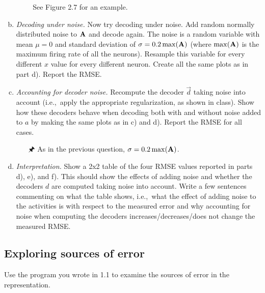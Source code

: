 \begin{enumerate}[a)]
		\begin{itemize}
			\item[{\symbolfont 📖}] See Figure 2.7 for an example.
		\end{itemize}
		\item {} \textit{Decoding under noise.} Now try decoding under noise. Add random normally distributed noise to ${\mathbf{A}}$ and decode again. The noise is a random variable with mean $\mu=0$ and standard deviation of $\sigma=0.2 \max({\mathbf{A}})$ (where $\max({\mathbf{A}})$ is the maximum firing rate of all the neurons). Resample this variable for every different $x$ value for every different neuron. Create all the same plots as in part d). Report the RMSE.
		\item {} \textit{Accounting for decoder noise.} Recompute the decoder $\vec d$ taking noise into account (i.e.,~apply the appropriate regularization, as shown in class). Show how these decoders behave when decoding both with and without noise added to $a$ by making the same plots as in c) and d). Report the RMSE for all cases.
		\begin{itemize}
			\item[{\symbolfont 🖈}] As in the previous question, $\sigma = 0.2 \max({\mathbf{A}})$.
		\end{itemize}
		\item {} \textit{Interpretation.} Show a 2x2 table of the four RMSE values reported in parts d), e), and f). This should show the effects of adding noise and whether the decoders $d$ are computed taking noise into account. Write a few sentences commenting on what the table shows, i.e.,~what the effect of adding noise to the activities is with respect to the measured error and why accounting for noise when computing the decoders increases/decreases/does not change the measured RMSE.
	\end{enumerate}

	\subsection{Exploring sources of error}

	Use the program you wrote in 1.1 to examine the sources of error in the representation.

